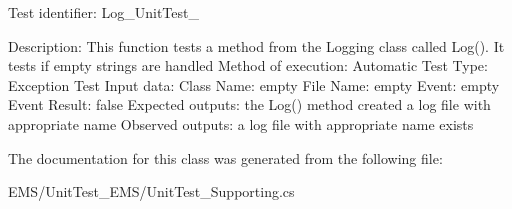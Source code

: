 Test identifier\-: Log\-\_\-\-Unit\-Test\-\_ \begin{DoxyVerb}    Description:                        This function tests a method from the Logging class called Log(). It tests if empty strings are handled
    Method of execution:                Automatic  
    Test Type:                          Exception Test
    Input data:                         Class Name:      empty
                                        File Name:       empty
                                        Event:           empty
                                        Event Result:    false
    Expected outputs:                   the Log() method created a log file with appropriate name
    Observed outputs:                   a log file with appropriate name exists    
\end{DoxyVerb}
 

The documentation for this class was generated from the following file\-:\begin{DoxyCompactItemize}
\item 
E\-M\-S/\-Unit\-Test\-\_\-\-E\-M\-S/Unit\-Test\-\_\-\-Supporting.\-cs\end{DoxyCompactItemize}
